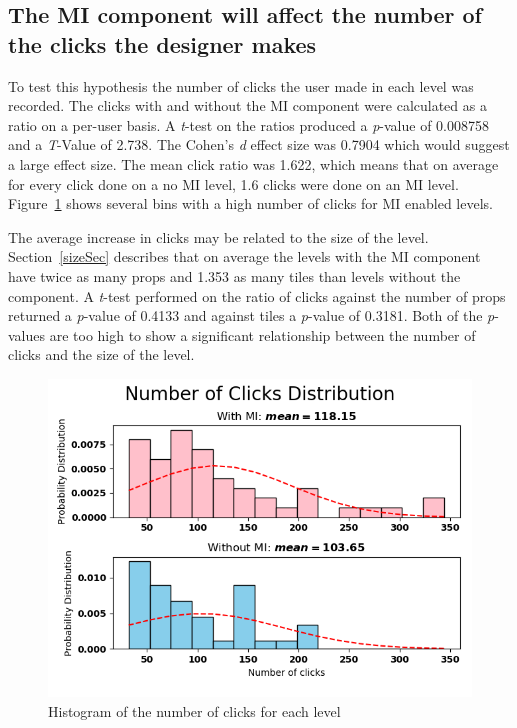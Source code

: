 \documentclass[journal]{IEEEtran}
\begin{document}
\subsection{The MI component will affect the number of the clicks the designer makes}\label{clicks}
To test this hypothesis the number of clicks the user made in each level was recorded. The clicks with and without the MI component were calculated as a ratio on a per-user basis. A \textit{t}-test on the ratios produced a \textit{p}-value of 0.008758 and a \textit{T}-Value of 2.738. The Cohen's \textit{d} effect size was 0.7904 which would suggest a large effect size\cite{cohen1988statistical}. The mean click ratio was 1.622, which means that on average for every click done on a no MI level, 1.6 clicks were done on an MI level.  Figure~\ref{clickDist} shows several bins with a high number of clicks for MI enabled levels.

The average increase in clicks may be related to the size of the level. Section~\ref{sizeSec} describes that on average the levels with the MI component have twice as many props and 1.353 as many tiles than levels without the component. A \textit{t}-test performed on the ratio of clicks against the number of props returned a \textit{p}-value of 0.4133 and against tiles a \textit{p}-value of 0.3181. Both of the \textit{p}-values are too high to show a significant relationship between the number of clicks and the size of the level.

\begin{figure}[h]
	\includegraphics[width=1\linewidth]{NumberofClicksDistribution.png}
	\caption{Histogram of the number of clicks for each level}
	\label{clickDist}
\end{figure} 
\end{document}
